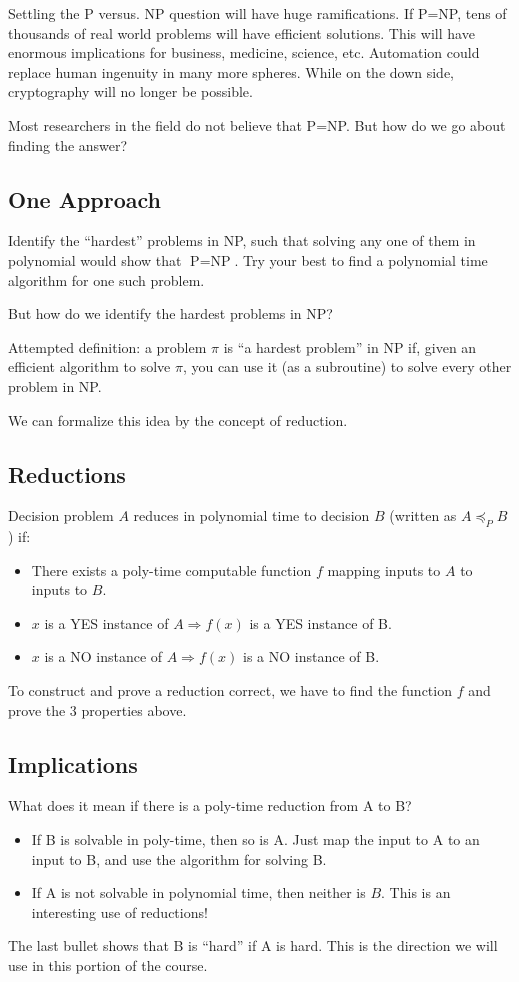 Settling the P versus. NP question will have huge ramifications. If P=NP, tens of thousands of real world problems will have efficient solutions. This will have enormous implications for business, medicine, science, etc. Automation could replace human ingenuity in many more spheres. While on the down side, cryptography will no longer be possible.

Most researchers in the field do not believe that P=NP. But how do we go about finding the answer?

\subsection{One Approach}
Identify the ``hardest'' problems in NP, such that solving any one of them in polynomial would show that $\text{P} = \text{NP}$. Try your best to find a polynomial time algorithm for one such problem. 

But how do we identify the hardest problems in NP?

Attempted definition: a problem $\pi$ is ``a hardest problem'' in NP if, given an efficient algorithm to solve $\pi$, you can use it (as a subroutine) to solve every other problem in NP.

We can formalize this idea by the concept of reduction.

\subsection{Reductions}
Decision problem $A$ reduces in polynomial time to decision $B$ (written as $A \preccurlyeq_P  B$) if:
\begin{itemize}
	\item There exists a poly-time computable function $f$ mapping inputs to $A$ to  inputs to $B$.
	\item $x$ is a YES instance of $A \Rightarrow f(x)$ is a YES instance of B.
	\item $x$ is a NO instance of $A \Rightarrow f(x)$ is a NO instance of B.
\end{itemize}

To construct and prove a reduction correct, we have to find the function $f$ and prove the 3 properties above.

\subsection{Implications}
What does it mean if there is a poly-time reduction from A to B?
\begin{itemize}
	\item If B is solvable in poly-time, then so is A. Just map the input to A to an input to B, and use the algorithm for solving B.
	
	\item If A is not solvable in polynomial time, then neither is $B$. This is an interesting use of reductions!
\end{itemize}

The last bullet shows that B is ``hard'' if A is hard. This is the direction we will use in this portion of the course.

